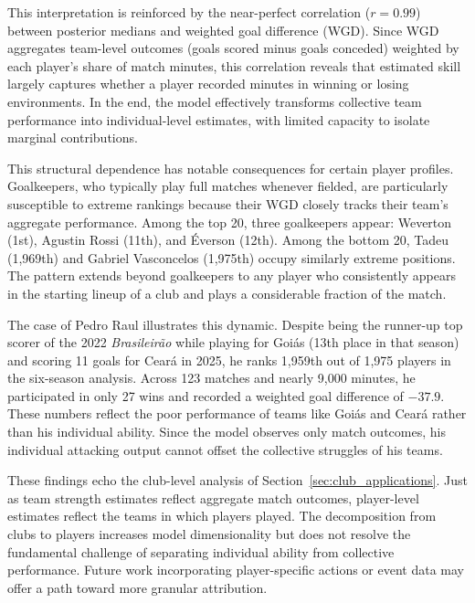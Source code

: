 This interpretation is reinforced by the near-perfect correlation ($r = 0.99$) between posterior medians and weighted goal difference (WGD).
Since WGD aggregates team-level outcomes (goals scored minus goals conceded) weighted by each player's share of match minutes, this correlation reveals that estimated skill largely captures whether a player recorded minutes in winning or losing environments.
In the end, the model effectively transforms collective team performance into individual-level estimates, with limited capacity to isolate marginal contributions.

This structural dependence has notable consequences for certain player profiles.
Goalkeepers, who typically play full matches whenever fielded, are particularly susceptible to extreme rankings because their WGD closely tracks their team's aggregate performance.
Among the top 20, three goalkeepers appear: Weverton (1st), Agustin Rossi (11th), and Éverson (12th).
Among the bottom 20, Tadeu (1,969th) and Gabriel Vasconcelos (1,975th) occupy similarly extreme positions.
The pattern extends beyond goalkeepers to any player who consistently appears in the starting lineup of a club and plays a considerable fraction of the match.

The case of Pedro Raul illustrates this dynamic.
Despite being the runner-up top scorer of the 2022 \textit{Brasileirão} while playing for Goiás (13th place in that season) and scoring 11 goals for Ceará in 2025, he ranks 1,959th out of 1,975 players in the six-season analysis.
Across 123 matches and nearly 9,000 minutes, he participated in only 27 wins and recorded a weighted goal difference of $-37.9$.
These numbers reflect the poor performance of teams like Goiás and Ceará rather than his individual ability.
Since the model observes only match outcomes, his individual attacking output cannot offset the collective struggles of his teams.

These findings echo the club-level analysis of Section~\ref{sec:club_applications}.
Just as team strength estimates reflect aggregate match outcomes, player-level estimates reflect the teams in which players played.
The decomposition from clubs to players increases model dimensionality but does not resolve the fundamental challenge of separating individual ability from collective performance.
Future work incorporating player-specific actions or event data may offer a path toward more granular attribution.
